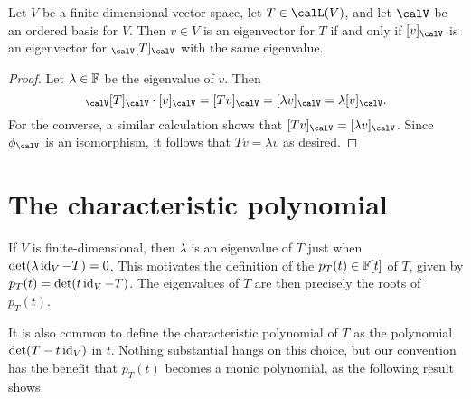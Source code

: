 \begin{lemma}
    \label{lemma:mr-eigenvalues}
    Let $V$ be a finite-dimensional vector space, let $T \in \lin(V)$, and let $\calV$ be an ordered basis for $V$. Then $v \in V$ is an eigenvector for $T$ if and only if $\coordvec{v}{\calV}$ is an eigenvector for $\mr{\calV}{T}{\calV}$ with the same eigenvalue.
\end{lemma}

\begin{proof}
    Let $\lambda \in \mathbb{F}$ be the eigenvalue of $v$. Then
    \begin{equation*}
        \mr{\calV}{T}{\calV} \cdot \coordvec{v}{\calV}
            = \coordvec{Tv}{\calV}
            = \coordvec{\lambda v}{\calV}
            = \lambda \coordvec{v}{\calV}.
    \end{equation*}
    For the converse, a similar calculation shows that  $\coordvec{Tv}{\calV} = \coordvec{\lambda v}{\calV}$. Since $\coordmap{\calV}$ is an isomorphism, it follows that $Tv = \lambda v$ as desired.
\end{proof}



\section{The characteristic polynomial}

If $V$ is finite-dimensional, then $\lambda$ is an eigenvalue of $T$ just when $\det(\lambda \operatorname{id}_V - T) = 0$. This motivates the definition of the  $p_T(t) \in \mathbb{F}[t]$ of $T$, given by $p_T(t) = \det(t \operatorname{id}_V - T)$. The eigenvalues of $T$ are then precisely the roots of $p_T(t)$.

It is also common to define the characteristic polynomial of $T$ as the polynomial $\det(T - t \operatorname{id}_V)$ in $t$. Nothing substantial hangs on this choice, but our convention has the benefit that $p_T(t)$ becomes a monic polynomial, as the following result shows:

